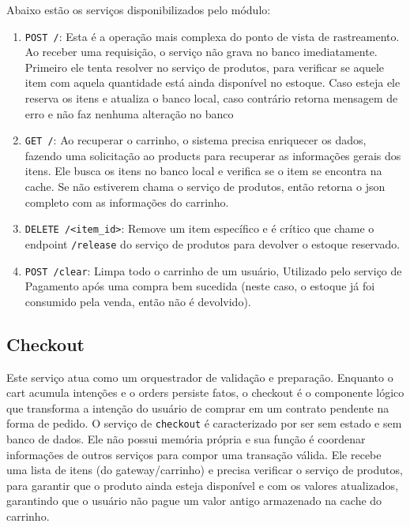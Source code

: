 Abaixo estão os serviços disponibilizados pelo módulo:
\begin{enumerate}
    \item \texttt{POST /}: Esta é a operação mais complexa do ponto de vista de rastreamento. Ao receber uma requisição, o serviço não grava no banco imediatamente. Primeiro ele tenta resolver no serviço de produtos, para verificar se aquele item com aquela quantidade está ainda disponível no estoque. Caso esteja ele reserva os itens e atualiza o banco local, caso contrário retorna mensagem de erro e não faz nenhuma alteração no banco
    \item \texttt{GET /}: Ao recuperar o carrinho, o sistema precisa enriquecer os dados, fazendo uma solicitação ao products para recuperar as informações gerais dos itens. Ele busca os itens no banco local e verifica se o item se encontra na cache. Se não estiverem chama o serviço de produtos, então retorna o json completo com as informações do carrinho.
    \item \texttt{DELETE /<item\_id>}: Remove um item específico e é crítico que chame o endpoint \texttt{/release} do serviço de produtos para devolver o estoque reservado.
    \item \texttt{POST /clear}: Limpa todo o carrinho de um usuário, Utilizado pelo serviço de Pagamento após uma compra bem sucedida (neste caso, o estoque já foi consumido pela venda, então não é devolvido).
\end{enumerate}

\subsection{Checkout}
Este serviço atua como um orquestrador de validação e preparação. Enquanto o cart acumula intenções e o orders persiste fatos, o checkout é o componente lógico que transforma a intenção do usuário de comprar em um contrato pendente na forma de pedido. O serviço de \texttt{checkout} é caracterizado por ser sem estado e sem banco de dados. Ele não possui memória própria e sua função é coordenar informações de outros serviços para compor uma transação válida. Ele recebe uma lista de itens (do gateway/carrinho) e precisa verificar o serviço de produtos, para garantir que o produto ainda esteja disponível e com os valores atualizados, garantindo que o usuário não pague um valor antigo armazenado na cache do carrinho.

